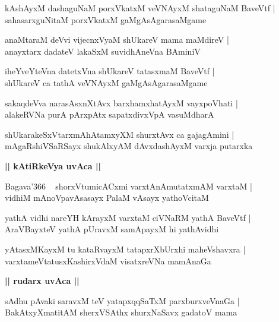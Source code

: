 \documentclass[twoside,12pt,openright]{book}
\newcounter{shloka}[chapter]
\def\uvaca#1{\centerline{{\large\textbf{#1}}}}
\begin{document}
\begin{shloka}%
kAshAyxM dashaguNaM porxVkatxM veVNAyxM shataguNaM BaveVtf |\\
sahasarxguNitaM porxVkatxM gaMgAsAgarasaMgame
\end{shloka}

\begin{shloka}%
anaMtaraM deVvi vijecnxVyaM shUkareV mama maMdireV |\\
anayxtarx dadateV lakaSxM suvidhAneVna BAminiV 
\end{shloka}

\begin{shloka}%
iheYveYteVna datetxVna shUkareV tatasxmaM BaveVtf |\\
shUkareV ca tathA veVNAyxM gaMgAsAgarasaMgame
\end{shloka}

\begin{shloka}%
sakaqdeVva narasAsxnXtAvx barxhamxhatAyxM vayxpoVhati |\\
alakeRVNa purA pArxpAtx sapatxdivxVpA vasuMdharA
\end{shloka}

\begin{shloka}%
shUkarakeSxVtarxmAhAtamxyXM shurxtAvx ca gajagAmini |\\
mAgaRshiVSaRSayx shukAlxyAM dAvxdashAyxM varxja putarxka 
\end{shloka}

\uvaca{|| kAtiRkeVya uvAca ||}

\begin{shloka}%
Bagava\char'366  ~ shorxVtumicACxmi varxtAnAmutatxmAM varxtaM |\\
vidhiM mAnoVpavAsasayx PalaM vAsayx yathoVcitaM 
\end{shloka}

\begin{shloka}%
yathA vidhi nareYH kArayxM varxtaM ciVNaRM yathA BaveVtf |\\
AraVBayxteV yathA pUravxM samApayxM hi yathAvidhi
\end{shloka}

\begin{shloka}%
yAtasxMKayxM tu kataRvayxM tatapxrXbUrxhi maheVshavxra |\\
varxtameVtatusxKashirxVdaM visatxreVNa mamAnaGa
\end{shloka}

\uvaca{|| rudarx uvAca ||}

\begin{shloka}%
sAdhu pAvaki saravxM teV yatapxqqSaTxM parxburxveVnaGa |\\
BakAtxyXmatitAM sherxVSAthx shurxNaSavx gadatoV mama 
\end{shloka}
\end{document}
